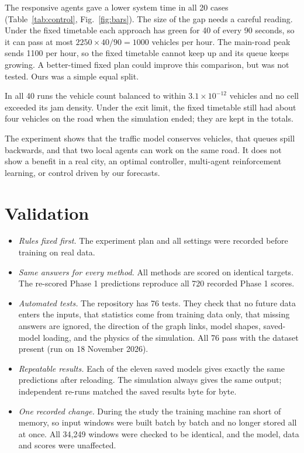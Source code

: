 \documentclass[conference]{IEEEtran}
\begin{document}
The responsive agents gave a lower system time in all 20 cases (Table~\ref{tab:control}, Fig.~\ref{fig:bars}). The size of the gap needs a careful reading. Under the fixed timetable each approach has green for 40 of every 90 seconds, so it can pass at most $2250\times40/90=1000$ vehicles per hour. The main-road peak sends 1100 per hour, so the fixed timetable cannot keep up and its queue keeps growing. A better-timed fixed plan could improve this comparison, but was not tested. Ours was a simple equal split.

In all 40 runs the vehicle count balanced to within $3.1\times10^{-12}$ vehicles and no cell exceeded its jam density. Under the exit limit, the fixed timetable still had about four vehicles on the road when the simulation ended; they are kept in the totals.

The experiment shows that the traffic model conserves vehicles, that queues spill backwards, and that two local agents can work on the same road. It does not show a benefit in a real city, an optimal controller, multi-agent reinforcement learning, or control driven by our forecasts.

\section{Validation}
\begin{itemize}
\item \emph{Rules fixed first.} The experiment plan and all settings were recorded before training on real data.
\item \emph{Same answers for every method.} All methods are scored on identical targets. The re-scored Phase 1 predictions reproduce all 720 recorded Phase 1 scores.
\item \emph{Automated tests.} The repository has 76 tests. They check that no future data enters the inputs, that statistics come from training data only, that missing answers are ignored, the direction of the graph links, model shapes, saved-model loading, and the physics of the simulation. All 76 pass with the dataset present (run on 18 November 2026).
\item \emph{Repeatable results.} Each of the eleven saved models gives exactly the same predictions after reloading. The simulation always gives the same output; independent re-runs matched the saved results byte for byte.
\item \emph{One recorded change.} During the study the training machine ran short of memory, so input windows were built batch by batch and no longer stored all at once. All 34,249 windows were checked to be identical, and the model, data and scores were unaffected.
\end{itemize}
\end{document}
